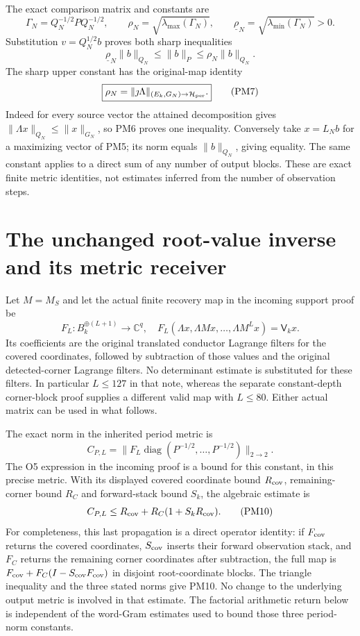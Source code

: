 \documentclass[11pt]{article}
\newcommand{\C}{\mathbb C}
\newcommand{\diag}{\operatorname{diag}}
\begin{document}
The exact comparison matrix and constants are
\[
 \Gamma_N=Q_N^{-1/2}P Q_N^{-1/2},\qquad
 \rho_N=\sqrt{\lambda_{\max}(\Gamma_N)},\qquad
 \underline\rho_N=\sqrt{\lambda_{\min}(\Gamma_N)}>0.             \tag{PM5}
\]
Substitution $v=Q_N^{1/2}b$ proves both sharp inequalities
\[
 \underline\rho_N\|b\|_{Q_N}\le\|b\|_P
                         \le\rho_N\|b\|_{Q_N}.                 \tag{PM6}
\]
The sharp upper constant has the original-map identity
\[
 \boxed{\rho_N=\|\jmath\Lambda\|_{(E_k,G_N)\to\mathcal H_{\rm per}}.}
                                                                    \tag{PM7}
\]
Indeed for every source vector the attained decomposition gives
$\|\Lambda x\|_{Q_N}\le\|x\|_{G_N}$, so PM6 proves one
inequality.  Conversely take $x=L_Nb$ for a maximizing vector of
PM5; its norm equals $\|b\|_{Q_N}$, giving equality.  The same
constant applies to a direct sum of any number of output blocks.
These are exact finite metric identities, not estimates inferred
from the number of observation steps.

\section{The unchanged root-value inverse and its metric receiver}
Let $M=M_S$ and let the actual finite recovery map in the incoming
support proof be
\[
 F_L:B_k^{\oplus(L+1)}\longrightarrow\C^q,
 \quad F_L(\Lambda x,\Lambda Mx,\ldots,\Lambda M^Lx)
                                  =\mathsf V_kx.               \tag{PM8}
\]
Its coefficients are the original translated conductor Lagrange
filters for the covered coordinates, followed by subtraction of
those values and the original detected-corner Lagrange filters.
No determinant estimate is substituted for these filters.
In particular $L\le127$ in that note, whereas the separate
constant-depth corner-block proof supplies a different valid map
with $L\le80$.  Either actual matrix can be used in what follows.

The exact norm in the inherited period metric is
\[
 C_{P,L}=\|F_L\diag(P^{-1/2},\ldots,P^{-1/2})\|_{2\to2}.       \tag{PM9}
\]
The O5 expression in the incoming proof is a bound for this
constant, in this precise metric.  With its displayed covered
coordinate bound $R_{\rm cov}$, remaining-corner bound $R_C$
and forward-stack bound $S_k$, the algebraic estimate is
\[
 C_{P,L}\le R_{\rm cov}+R_C(1+S_kR_{\rm cov}).                  \tag{PM10}
\]
For completeness, this last propagation is a direct operator
identity: if $F_{\rm cov}$ returns the covered coordinates,
$S_{\rm cov}$ inserts their forward observation stack, and
$F_C$ returns the remaining corner coordinates after subtraction,
the full map is
$F_{\rm cov}+F_C(I-S_{\rm cov}F_{\rm cov})$ in disjoint
root-coordinate blocks.  The triangle inequality and the three
stated norms give PM10.  No change to the underlying output
metric is involved in that estimate.  The factorial arithmetic
return below is independent of the word-Gram estimates used to
bound those three period-norm constants.
\end{document}
